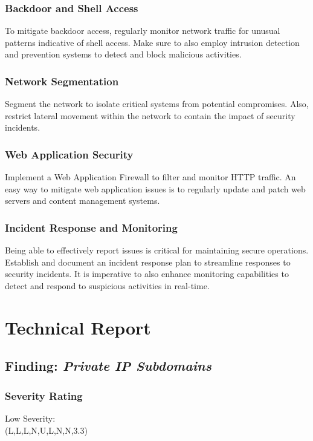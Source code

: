 \documentclass[notitlepage]{article}
\begin{document}
\subsubsection*{Backdoor and Shell Access}
To mitigate backdoor access, regularly monitor network traffic for unusual patterns indicative of shell access.
Make sure to also employ intrusion detection and prevention systems to detect and block malicious activities.


\subsubsection*{Network Segmentation}
Segment the network to isolate critical systems from potential compromises. Also, restrict lateral
movement within the network to contain the impact of security incidents.


\subsubsection*{Web Application Security}
Implement a Web Application Firewall to filter and monitor HTTP traffic. An easy
way to mitigate web application issues is to regularly update and patch web servers 
and content management systems.


\subsubsection*{Incident Response and Monitoring}
Being able to effectively report issues is critical for maintaining secure operations. Establish and
document an incident response plan to streamline responses to security incidents. It is
imperative to also enhance monitoring capabilities to detect and respond to suspicious activities in real-time.


\section{Technical Report}


  \subsection{Finding: \emph{Private IP Subdomains}}
  
	\subsubsection*{Severity Rating}
        Low Severity: \\
		\cvss(L,L,L,N,U,L,N,N,3.3)
		
\end{document}
